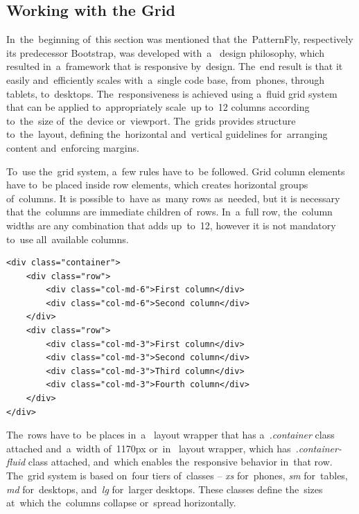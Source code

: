 \subsection{Working with the Grid}
In~the~beginning of~this section was mentioned that the~PatternFly, respectively
its predecessor Bootstrap, was developed with~a~ design
philosophy, which resulted in~a~framework that is responsive by~design. The~end
result is that it easily and~efficiently scales with~a~single code base,
from~phones, through tablets, to~desktops. The~responsiveness is achieved using
a~fluid grid system that can be applied to~appropriately scale~up to~12 columns
according to~the~size of~the~device or~viewport. The~grids provides structure
to~the~layout, defining the~horizontal and~vertical guidelines for~arranging
content and~enforcing margins.

To~use the~grid system, a~few rules have to~be followed. Grid column elements
have to~be placed inside row elements, which creates horizontal groups
of~columns. It is possible to~have as~many rows as~needed, but it is necessary
that the~columns are immediate children of~rows. In~a~full row, the~column
widths are any combination that adds up~to~12, however it is not mandatory
to~use all~available columns.

\begin{lstlisting}[caption=An~illustration of~the~grid system in~PatternFly.,
label=lst-grid, style=dp-html]
<div class="container">
	<div class="row">
		<div class="col-md-6">First column</div>
		<div class="col-md-6">Second column</div>
	</div>
	<div class="row">
		<div class="col-md-3">First column</div>
		<div class="col-md-3">Second column</div>
		<div class="col-md-3">Third column</div>
		<div class="col-md-3">Fourth column</div>
	</div>
</div>
\end{lstlisting}

The~rows have to~be places in~a~ layout wrapper that has
a~\textit{.container} class attached and~a~width of~1170px or~in~
layout wrapper, which has~\textit{.container-fluid} class attached, and~which
enables the~responsive behavior in~that row. The~grid system is based on~four
tiers of~classes -- \textit{xs} for~phones, \textit{sm} for~tables, \textit{md}
for~desktops, and~\textit{lg} for~larger desktops. These classes define
the~sizes at~which the~columns collapse or~spread horizontally. 


